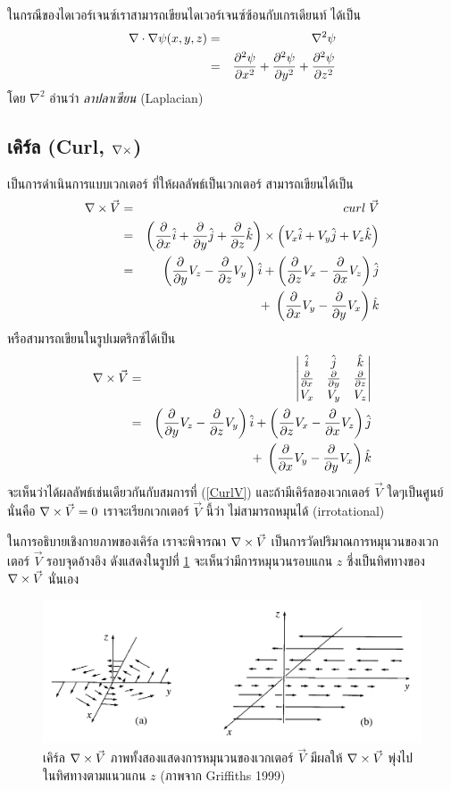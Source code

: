 ในกรณีของไดเวอร์เจนซ์เราสามารถเขียนไดเวอร์เจนซ์ซ้อนกับเกรเดียนท์ ได้เป็น
\begin{eqnarray}\label{LaplacianPsi}
\nabla\cdot\nabla\psi(x, y, z) &=& \nabla^2\psi \nonumber \\
        &=& \frac{\partial^2\psi}{\partial x^2} + \frac{\partial^2\psi}{\partial y^2} + \frac{\partial^2\psi}{\partial z^2}
\end{eqnarray}
โดย $\nabla^2$ อ่านว่า \emph{ลาปลาเซียน} (Laplacian)

\subsection{เคิร์ล (Curl, $\nabla\times$)}

เป็นการดำเนินการแบบเวกเตอร์ ที่ให้ผลลัพธ์เป็นเวกเตอร์ สามารถเขียนได้เป็น
\begin{eqnarray}\label{CurlV}
\nabla\times\vec{V} &=& curl\;\vec{V} \nonumber \\
        &=& \left(\frac{\partial}{\partial x}\hat{i} + \frac{\partial}{\partial y}\hat{j} + \frac{\partial}{\partial z}\hat{k}\right)\times\left(V_x\hat{i} + V_y\hat{j} + V_z\hat{k}\right) \nonumber \\
        &=& \left(\frac{\partial}{\partial y} V_z - \frac{\partial}{\partial z} V_y\right)\hat{i} + \left(\frac{\partial}{\partial z} V_x - \frac{\partial}{\partial x} V_z\right)\hat{j} \nonumber \\
         & & +\; \left(\frac{\partial}{\partial x} V_y - \frac{\partial}{\partial y} V_x\right)\hat{k}
\end{eqnarray}
หรือสามารถเขียนในรูปเมตริกซ์ได้เป็น
\begin{eqnarray}\label{CurlVMatrix}
\nabla\times\vec{V} &=& \begin{vmatrix} \hat{i} & \hat{j} & \hat{k} \\ \frac{\partial}{\partial x} & \frac{\partial}{\partial y} & \frac{\partial}{\partial z} \\ V_x & V_y & V_z \end{vmatrix} \nonumber \\
        &=& \left(\frac{\partial}{\partial y} V_z - \frac{\partial}{\partial z} V_y\right)\hat{i} + \left(\frac{\partial}{\partial z} V_x - \frac{\partial}{\partial x} V_z\right)\hat{j} \nonumber \\
        & & +\; \left(\frac{\partial}{\partial x} V_y - \frac{\partial}{\partial y} V_x\right)\hat{k}
\end{eqnarray}
จะเห็นว่าได้ผลลัพธ์เช่นเดียวกันกับสมการที่ (\ref{CurlV}) และถ้ามีเคิร์ลของเวกเตอร์ $\vec{V}$ ใดๆเป็นศูนย์ นั่นคือ $\nabla\times\vec{V} = 0$ เราจะเรียกเวกเตอร์ $\vec{V}$ นี้ว่า ไม่สามารถหมุนได้ (irrotational)

ในการอธิบายเชิงกายภาพของเคิร์ล เราจะพิจารณา $\nabla\times\vec{V}$ เป็นการวัดปริมาณการหมุนวนของเวกเตอร์ $\vec{V}$ รอบจุดอ้างอิง ดังแสดงในรูปที่ \ref{fig5} จะเห็นว่ามีการหมุนวนรอบแกน $z$ ซึ่งเป็นทิศทางของ $\nabla\times\vec{V}$ นั่นเอง

\begin{figure}%
\centering
\includegraphics[width=1.0\columnwidth]{Curl.png}
\caption{เคิร์ล $\nabla\times\vec{V}$ ภาพทั้งสองแสดงการหมุนวนของเวกเตอร์ $\vec{V}$ มีผลให้ $\nabla\times\vec{V}$ พุ่งไปในทิศทางตามแนวแกน $z$ (ภาพจาก Griffiths 1999)}
\label{fig5}
\end{figure}

